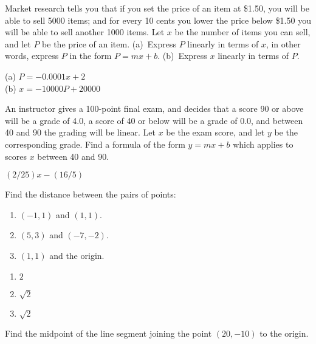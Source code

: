 \begin{enumialphparenastyle}
\begin{ex}
Market research tells you that if you set the price of an item at
\$1.50, you will be able to sell 5000 items; and for every 10 cents you
lower the price below \$1.50 you will be able to sell another 1000 items.
Let $x$ be the number of items you can sell, and let $P$ be the price of
an item.  (a)~Express $P$ linearly in terms of $x$, in other words,
express $P$ in the form $P=mx+b$.  (b)~Express $x$
linearly in terms of $P$.
\begin{sol}
(a) $P=-0.0001x+2$\\
(b) $x=-10000P+20000$
\end{sol}
\end{ex}

\begin{ex}
An instructor gives a 100-point final exam, and decides that a score
90 or above will be a grade of 4.0, a score of 40 or below will be a grade
of 0.0, and between 40 and 90 the grading will be linear.  Let $x$ be
the exam score, and let $y$ be the corresponding grade.  Find a formula
of the form $y=mx+b$ which applies to scores $x$ between 40 and 90.
\begin{sol}
$(2/25)x-(16/5)$
\end{sol}
\end{ex}

\begin{ex}
Find the distance between the pairs of points:
\begin{enumerate}
	\item	$(-1,1)$ and $(1,1)$.
	\item	$(5,3)$ and $(-7,-2)$.
	\item	$(1,1)$ and the origin.
\end{enumerate}
\begin{sol}
\begin{enumerate}
	\item	$2$
	\item	$\sqrt{2}$
	\item	$\sqrt{2}$
\end{enumerate}
\end{sol}
\end{ex}

\begin{ex}
Find the midpoint of the line segment joining the point $(20,-10)$ to the origin.
\end{ex}


\end{enumialphparenastyle}
